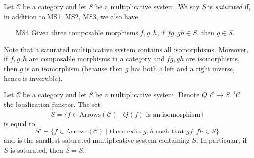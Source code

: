 \begin{definition}
\label{definition-saturated-multiplicative-system}
Let $\mathcal{C}$ be a category and let $S$ be a multiplicative system.
We say $S$ is {\it saturated} if, in addition to MS1, MS2, MS3, we
also have
\begin{enumerate}
\item[MS4] Given three composable morphisms $f, g, h$, if
$fg, gh \in S$, then $g \in S$.
\end{enumerate}
\end{definition}

\noindent
Note that a saturated multiplicative system contains all isomorphisms.
Moreover, if  $f, g, h$ are composable morphisms in a category and
$fg, gh$ are isomorphisms, then $g$ is an isomorphism (because then $g$
has both a left and a right inverse, hence is invertible).

\begin{lemma}
\label{lemma-what-gets-inverted}
Let $\mathcal{C}$ be a category and let $S$ be a multiplicative system.
Denote $Q : \mathcal{C} \to S^{-1}\mathcal{C}$ the localization functor.
The set
$$
\hat S = \{f \in \text{Arrows}(\mathcal{C}) \mid
Q(f) \text{ is an isomorphism}\}
$$
is equal to
$$
S' = \{f \in \text{Arrows}(\mathcal{C}) \mid
\text{there exist }g, h\text{ such that }gf, fh \in S\}
$$
and is the smallest saturated multiplicative system containing $S$.
In particular, if $S$ is saturated, then $\hat S = S$.
\end{lemma}


